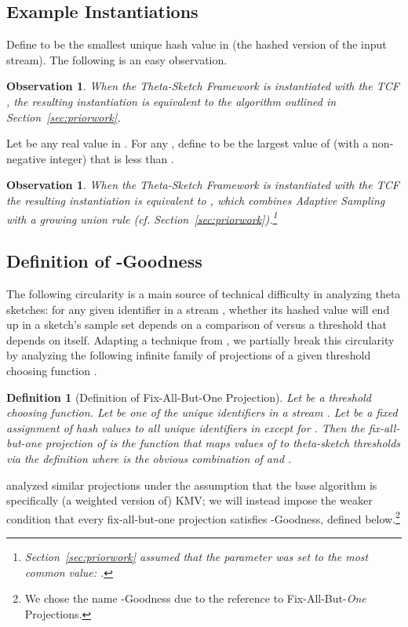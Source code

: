 \documentclass{article}
\newtheorem{definition}[theorem]{Definition}
\newtheorem{observation}[theorem]{Observation}
\begin{document}
\subsection{Example Instantiations}
\label{sec:exampleinstantiations} 
Define  to be the  smallest unique hash value in 
 (the hashed version of the input stream).
The following is an easy observation. 
\begin{observation}
\label{obs:kmv}
When the Theta-Sketch Framework is instantiated with the TCF , 
the resulting instantiation is equivalent to the 
algorithm outlined in  
Section~\ref{sec:priorwork}.
\end{observation}
Let  be any real value in . For any , define  to be the 
largest value of  (with  a
non-negative integer) that is less than . 
\begin{observation} 
\label{obs:adapt}
When the Theta-Sketch Framework is instantiated with the TCF 
the resulting instantiation is equivalent to , which 
combines Adaptive Sampling with a growing union rule (cf. Section~\ref{sec:priorwork}).\footnote{ 
Section~\ref{sec:priorwork} assumed that the parameter  was set to the most common value: .}
\end{observation}

\subsection{Definition of -Goodness}\label{sec:sufficient-condition}


The following circularity is a main source of technical difficulty in analyzing theta
sketches:
for any given identifier  in a stream , whether its hashed value 
will end up in a sketch's sample set  depends on a comparison of  versus a threshold  that
depends on  itself.
Adapting a technique from \cite{cohen2009leveraging}, we partially break this circularity by analyzing 
the following infinite family of projections of a given threshold choosing function . 

\begin{definition}[Definition of Fix-All-But-One Projection]\label{def:fabo-projection}
Let  be a threshold choosing function.
Let  be one of the  unique identifiers in a stream . Let  be a fixed assignment of 
hash values to all unique identifiers in  {\em except} for . 
Then the fix-all-but-one projection  of 
is the function that maps values of  to theta-sketch thresholds via the definition
 where  is the obvious combination of  and .
\end{definition}
\cite{cohen2009leveraging} analyzed similar projections under the assumption
that the base algorithm is specifically (a weighted version of) KMV; we will instead 
impose the weaker condition that every fix-all-but-one projection satisfies -Goodness, defined below.\footnote{We chose the name -Goodness due to the reference to Fix-All-But-\emph{One} Projections.}
\end{document}
